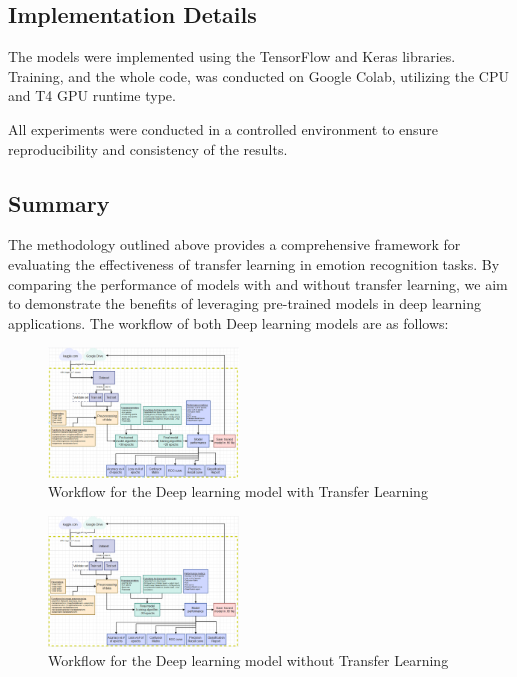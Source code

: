 \documentclass[conference]{IEEEtran}
\begin{document}
\subsection{Implementation Details}
The models were implemented using the TensorFlow and Keras libraries. Training, and the whole code, was conducted on Google Colab, utilizing the CPU and T4 GPU runtime type. 

All experiments were conducted in a controlled environment to ensure reproducibility and consistency of the results.


\subsection{Summary}
The methodology outlined above provides a comprehensive framework for evaluating the effectiveness of transfer learning in emotion recognition tasks. By comparing the performance of models with and without transfer learning, we aim to demonstrate the benefits of leveraging pre-trained models in deep learning applications. The workflow of both Deep learning models are as follows:
\begin{figure}[H]
    \centering
    \includegraphics[width=0.45\textwidth]{Figures/Trans_learn_workflow.png}
    \caption{Workflow for the Deep learning model with Transfer Learning}
    \label{fig:workflow_DLTL}
\end{figure}
\begin{figure}[H]
    \centering
    \includegraphics[width=0.45\textwidth]{Figures/no_Trans_learn_workflow.png}
    \caption{Workflow for the Deep learning model without Transfer Learning}
    \label{fig:workflow_DLnoTL}
\end{figure}
\end{document}
